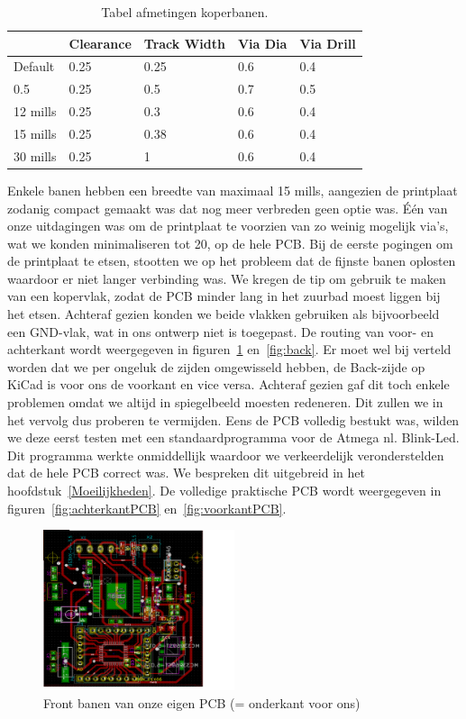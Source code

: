 \begin {table}[H]
\caption {Tabel afmetingen koperbanen.} \label{table:afmetingen}
	\begin{center}
	\begin{tabular}{ | l | l | l | l | l |}
	\hline
	  & Clearance & Track Width & Via Dia & Via Drill\\ \hline
	Default & 0.25 & 0.25 & 0.6 & 0.4\\ \hline
	0.5 & 0.25 & 0.5 & 0.7 & 0.5 \\ \hline
	12 mills & 0.25 & 0.3 & 0.6 & 0.4 \\ \hline
	15 mills & 0.25 & 0.38 & 0.6 & 0.4 \\ \hline
	30 mills & 0.25 & 1 & 0.6 & 0.4 \\ \hline
	\end{tabular}
	\end{center}
\end{table}
 Enkele banen hebben een breedte van maximaal 15 mills, aangezien de printplaat zodanig compact gemaakt was dat nog meer verbreden geen optie was. \'E\'en van onze uitdagingen was om de printplaat te voorzien van zo weinig mogelijk via's, wat we konden minimaliseren tot 20, op de hele PCB. Bij de  eerste pogingen om de printplaat te etsen, stootten we op het probleem dat de fijnste banen oplosten waardoor er niet langer verbinding was. We kregen de tip om gebruik te maken van een kopervlak, zodat de PCB minder lang in het zuurbad moest liggen bij het etsen. Achteraf gezien konden we beide vlakken gebruiken als bijvoorbeeld een GND-vlak, wat in ons ontwerp niet is toegepast. De routing van voor- en achterkant wordt weergegeven in figuren~\ref{fig:front} en~\ref{fig:back}. Er moet wel bij verteld worden dat we per ongeluk de zijden omgewisseld hebben, de Back-zijde op KiCad is voor ons de voorkant en vice versa. Achteraf gezien gaf dit toch enkele problemen omdat we altijd in spiegelbeeld moesten redeneren. Dit zullen we in het vervolg dus proberen te vermijden. Eens de PCB volledig bestukt was, wilden we deze eerst testen met een standaardprogramma voor de Atmega nl. Blink-Led. Dit programma werkte onmiddellijk waardoor we verkeerdelijk veronderstelden dat de hele PCB correct was. We bespreken dit uitgebreid in het hoofdstuk~\ref{Moeilijkheden}. De volledige praktische PCB wordt weergegeven in figuren~\ref{fig:achterkantPCB} en~\ref{fig:voorkantPCB}. 
\begin{figure}[h]
\centering
\includegraphics[width=0.5\textwidth]{Front.png}
\caption{Front banen van onze eigen PCB (= onderkant voor ons)}
\label{fig:front}
\end{figure}

